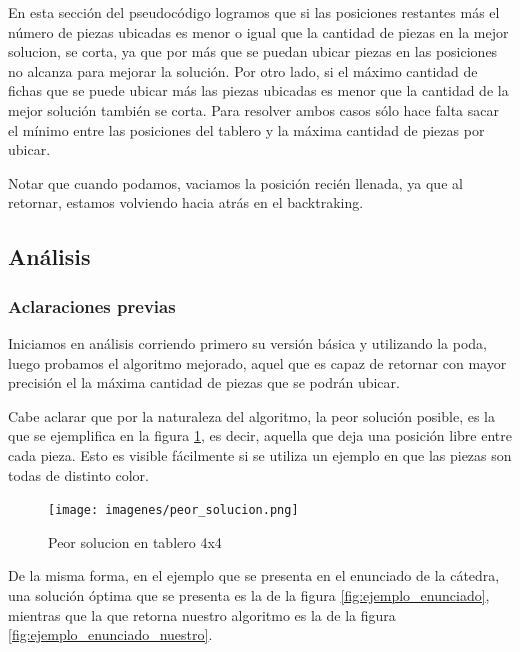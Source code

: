 \documentclass[11pt,a4paper]{article}
\begin{document}
En esta sección del pseudocódigo logramos que si las posiciones restantes más el número de piezas ubicadas es menor o igual que la cantidad de piezas en la mejor solucion, se corta, ya que por más que se puedan ubicar piezas en las posiciones no alcanza para mejorar la solución. Por otro lado, si el máximo cantidad de fichas que se puede ubicar más las piezas ubicadas es menor que la cantidad de la mejor solución también se corta.  Para resolver ambos casos sólo hace falta sacar el mínimo entre las posiciones del tablero y la máxima cantidad de piezas por ubicar.

Notar que cuando podamos, vaciamos la posición recién llenada, ya que al retornar, estamos volviendo hacia atrás en el backtraking.

\subsection*{Análisis}

\subsubsection*{Aclaraciones previas}

Iniciamos en análisis corriendo primero su versión básica y utilizando la poda, luego probamos el algoritmo mejorado, aquel que es capaz de retornar con mayor precisión el la máxima cantidad de piezas que se podrán ubicar.

Cabe aclarar que por la naturaleza del algoritmo, la peor solución posible, es la que se ejemplifica en la figura \ref{fig:peor_solucion}, es decir, aquella que deja una posición libre entre cada pieza. Esto es visible fácilmente si se utiliza un ejemplo en que las piezas son todas de distinto color.

	\begin{figure}[H]
    	\begin{center}
        	\texttt{[image: imagenes/peor\_solucion.png]}
    	\end{center}
    	\caption{Peor solucion en tablero 4x4}
    	\label{fig:peor_solucion}
	\end{figure}

De la misma forma, en el ejemplo que se presenta en el enunciado de la cátedra, una solución óptima que se presenta es la de la figura \ref{fig:ejemplo_enunciado}, mientras que la que retorna nuestro algoritmo es la de la figura \ref{fig:ejemplo_enunciado_nuestro}.
\end{document}

